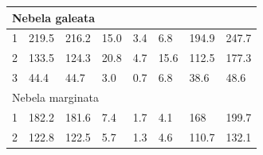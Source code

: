 \documentclass[12pt, a4paper]{article}
\begin{document}
\begin{table}[h]
{\begin{tabular}{|llllllll|}
\multicolumn{8}{|l|}{Nebela galeata}                                                                                                                                                                                                                                                                                                                                          \\ \hline
\multicolumn{1}{|l|}{1}                                         & \multicolumn{1}{l|}{219.5}                       & \multicolumn{1}{l|}{216.2}        & \multicolumn{1}{l|}{15.0}                        & \multicolumn{1}{l|}{3.4}                 & \multicolumn{1}{l|}{6.8}                      & \multicolumn{1}{l|}{194.9}        & 247.7                              \\ \hline
\multicolumn{1}{|l|}{2}                                         & \multicolumn{1}{l|}{133.5}                       & \multicolumn{1}{l|}{124.3}        & \multicolumn{1}{l|}{20.8}                        & \multicolumn{1}{l|}{4.7}                 & \multicolumn{1}{l|}{15.6}                     & \multicolumn{1}{l|}{112.5}        & 177.3                              \\ \hline
\multicolumn{1}{|l|}{3}                                         & \multicolumn{1}{l|}{44.4}                        & \multicolumn{1}{l|}{44.7}         & \multicolumn{1}{l|}{3.0}                         & \multicolumn{1}{l|}{0.7}                 & \multicolumn{1}{l|}{6.8}                      & \multicolumn{1}{l|}{38.6}         & 48.6                               \\ \hline
\multicolumn{8}{|l|}{Nebela marginata}                                                                                                                                                                                                                                                                                                                                        \\ \hline
\multicolumn{1}{|l|}{1}                                         & \multicolumn{1}{l|}{182.2}                       & \multicolumn{1}{l|}{181.6}        & \multicolumn{1}{l|}{7.4}                         & \multicolumn{1}{l|}{1.7}                 & \multicolumn{1}{l|}{4.1}                      & \multicolumn{1}{l|}{168}          & 199.7                              \\ \hline
\multicolumn{1}{|l|}{2}                                         & \multicolumn{1}{l|}{122.8}                       & \multicolumn{1}{l|}{122.5}        & \multicolumn{1}{l|}{5.7}                         & \multicolumn{1}{l|}{1.3}                 & \multicolumn{1}{l|}{4.6}                      & \multicolumn{1}{l|}{110.7}        & 132.1                              \\ \hline

\end{tabular}}
\end{table}
\end{document}
